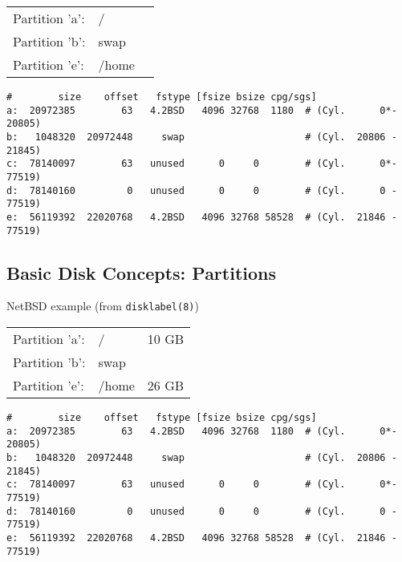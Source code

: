 \documentclass[xga]{xdvislides}
\begin{document}
\begin{tabular}{ l l c }
Partition 'a': & / & \\
Partition 'b': & swap & \\
Partition 'e': & /home & \\
\end{tabular}

\begin{verbatim}
#        size    offset   fstype [fsize bsize cpg/sgs]
a:  20972385        63   4.2BSD   4096 32768  1180  # (Cyl.      0*- 20805)
b:   1048320  20972448     swap                     # (Cyl.  20806 - 21845)
c:  78140097        63   unused      0     0        # (Cyl.      0*- 77519)
d:  78140160         0   unused      0     0        # (Cyl.      0 - 77519)
e:  56119392  22020768   4.2BSD   4096 32768 58528  # (Cyl.  21846 - 77519)
\end{verbatim}

\subsection{Basic Disk Concepts: Partitions}
NetBSD example (from {\tt disklabel(8)})

\begin{tabular}{ l l c }
Partition 'a': & / & 10 GB\\
Partition 'b': & swap & \\
Partition 'e': & /home & 26 GB\\
\end{tabular}

\begin{verbatim}
#        size    offset   fstype [fsize bsize cpg/sgs]
a:  20972385        63   4.2BSD   4096 32768  1180  # (Cyl.      0*- 20805)
b:   1048320  20972448     swap                     # (Cyl.  20806 - 21845)
c:  78140097        63   unused      0     0        # (Cyl.      0*- 77519)
d:  78140160         0   unused      0     0        # (Cyl.      0 - 77519)
e:  56119392  22020768   4.2BSD   4096 32768 58528  # (Cyl.  21846 - 77519)
\end{verbatim}
\end{document}
